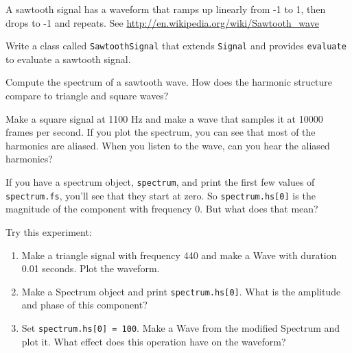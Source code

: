 \begin{exercise}
	A sawtooth signal has a waveform that ramps up linearly from -1 to 1,
	then drops to -1 and repeats. See
	\url{http://en.wikipedia.org/wiki/Sawtooth_wave}
	
	Write a class called
	{\tt SawtoothSignal} that extends {\tt Signal} and provides
	{\tt evaluate} to evaluate a sawtooth signal.
	
	Compute the spectrum of a sawtooth wave.  How does the harmonic
	structure compare to triangle and square waves?
\end{exercise}

\begin{exercise}
	Make a square signal at 1100 Hz and make a wave that samples it
	at 10000 frames per second.  If you plot the spectrum, you can
	see that most of the harmonics are aliased.
	When you listen to the wave, can you hear the aliased harmonics?
\end{exercise}


\begin{exercise}
	If you have a spectrum object, {\tt spectrum}, and print the
	first few values of {\tt spectrum.fs}, you'll see that they
	start at zero.  So {\tt spectrum.hs[0]} is the magnitude
	of the component with frequency 0.  But what does that mean?
	
	Try this experiment:
	
	\begin{enumerate}
		
		\item Make a triangle signal with frequency 440 and make
		a Wave with duration 0.01 seconds.  Plot the waveform.
		
		\item Make a Spectrum object and print {\tt spectrum.hs[0]}.
		What is the amplitude and phase of this component?
		
		\item Set {\tt spectrum.hs[0] = 100}.  Make a Wave from the
		modified Spectrum and plot it.  What effect does this operation
		have on the waveform?
		
	\end{enumerate}
	
\end{exercise}


